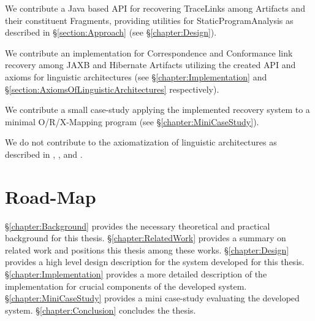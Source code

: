 \begin{contributions}

\item
We contribute a \gls{Java} based \gls{API} for recovering \glspl{TraceLink} among \glspl{Artifact} and their constituent \glspl{Fragment}, providing utilities for \gls{StaticProgramAnalysis} as described in §\ref{section:Approach} (see §\ref{chapter:Design}).

\item
We contribute an implementation for \gls{Correspondence} and \gls{Conformance} link recovery among \gls{JAXB} and \gls{Hibernate} \glspl{Artifact} utilizing the created \gls{API} and axioms for linguistic architectures (see §\ref{chapter:Implementation} and §\ref{section:AxiomsOfLinguisticArchitectures} respectively).

\item
We contribute a small case-study applying the implemented recovery system to a minimal \gls{O/R/X-Mapping} program (see §\ref{chapter:MiniCaseStudy}).

\end{contributions}

\begin{noncontributions}

\item
We do not contribute to the axiomatization of linguistic architectures as described in \cite{DBLP:conf/ecmdafa/LammelV14}, \cite{DBLP:journals/entcs/FavreN05}, \cite{DBLP:conf/sle/Lammel16} and \cite{HeinzLV17}.

\end{noncontributions}

\section{Road-Map}
§\ref{chapter:Background} provides the necessary theoretical and practical background for this thesis.
§\ref{chapter:RelatedWork} provides a summary on related work and positions this thesis among these works.
§\ref{chapter:Design} provides a high level design description for the system developed for this thesis.
§\ref{chapter:Implementation} provides a more detailed description of the implementation for crucial components of the developed system.
§\ref{chapter:MiniCaseStudy} provides a mini case-study evaluating the developed system.
§\ref{chapter:Conclusion} concludes the thesis.
